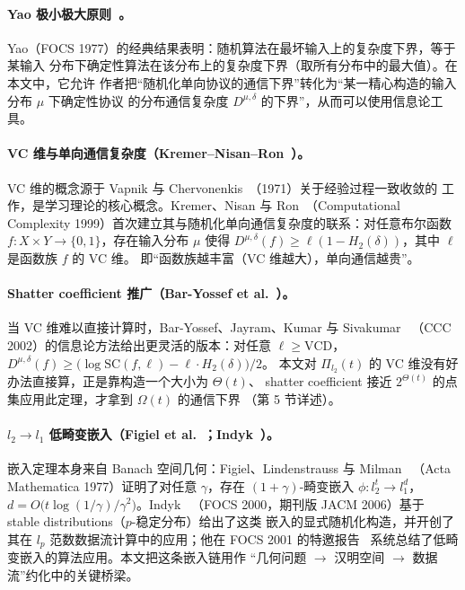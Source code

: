 \documentclass[UTF8, 11pt, a4paper, linestretch=1.15]{ctexart}
\theoremstyle{zhstyle}
\begin{document}
	\paragraph{Yao 极小极大原则~\cite{Yao77}。}
	Yao（FOCS 1977）的经典结果表明：随机算法在最坏输入上的复杂度下界，等于某输入
	分布下确定性算法在该分布上的复杂度下界（取所有分布中的最大值）。在本文中，它允许
	作者把“随机化单向协议的通信下界”转化为“某一精心构造的输入分布 $\mu$ 下确定性协议
	的分布通信复杂度 $D^{\mu,\delta}$ 的下界”，从而可以使用信息论工具。
	
	\paragraph{VC 维与单向通信复杂度（Kremer--Nisan--Ron~\cite{KNR99}）。}
	VC 维的概念源于 Vapnik 与 Chervonenkis~\cite{VC71}（1971）关于经验过程一致收敛的
	工作，是学习理论的核心概念。Kremer、Nisan 与 Ron~\cite{KNR99}（Computational
	Complexity 1999）首次建立其与随机化单向通信复杂度的联系：对任意布尔函数
	$f: X \times Y \to \{0,1\}$，存在输入分布 $\mu$ 使得
	$D^{\mu,\delta}(f) \geq \ell(1 - H_2(\delta))$，其中 $\ell$ 是函数族 $f$ 的 VC 维。
	即“函数族越丰富（VC 维越大），单向通信越贵”。
	
	\paragraph{Shatter coefficient 推广（Bar-Yossef et al.~\cite{BYJKS02}）。}
	当 VC 维难以直接计算时，Bar-Yossef、Jayram、Kumar 与 Sivakumar~\cite{BYJKS02}
	（CCC 2002）的信息论方法给出更灵活的版本：对任意 $\ell \geq \mathrm{VCD}$，
	$D^{\mu,\delta}(f) \geq \big(\log \mathrm{SC}(f, \ell) - \ell \cdot H_2(\delta)\big)/2$。
	本文对 $\Pi_{l_2}(t)$ 的 VC 维没有好办法直接算，正是靠构造一个大小为 $\Theta(t)$、
	shatter coefficient 接近 $2^{\Theta(t)}$ 的点集应用此定理，才拿到 $\Omega(t)$ 的通信下界
	（第 5 节详述）。
	
	\paragraph{$l_2 \to l_1$ 低畸变嵌入（Figiel et al.~\cite{FLM77}；Indyk~\cite{Indyk00}）。}
	嵌入定理本身来自 Banach 空间几何：Figiel、Lindenstrauss 与 Milman~\cite{FLM77}
	（Acta Mathematica 1977）证明了对任意 $\gamma$，存在 $(1+\gamma)$-畸变嵌入
	$\phi: l_2^t \to l_1^d$，$d = O\big(t \log(1/\gamma) / \gamma^2\big)$。Indyk~\cite{Indyk00}
	（FOCS 2000，期刊版 JACM 2006）基于 stable distributions（$p$-稳定分布）给出了这类
	嵌入的显式随机化构造，并开创了其在 $l_p$ 范数数据流计算中的应用；他在 FOCS 2001
	的特邀报告~\cite{Indyk01} 系统总结了低畸变嵌入的算法应用。本文把这条嵌入链用作
	“几何问题 $\to$ 汉明空间 $\to$ 数据流”约化中的关键桥梁。
	
\end{document}
